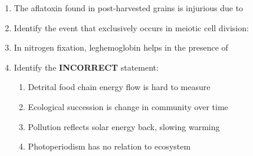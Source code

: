 \documentclass[journal]{IEEEtran}
\begin{document}
\begin{enumerate}
\item The aflatoxin found in post-harvested grains is injurious due to\hfill  \textit{}
\begin{enumerate}
\end{enumerate}

\item Identify the event that exclusively occurs in meiotic cell division:\hfill  \textit{}
\begin{enumerate}
\end{enumerate}

\item In nitrogen fixation, leghemoglobin helps in the presence of\hfill  \textit{}
\begin{enumerate}
\end{enumerate}

\item Identify the \textbf{INCORRECT} statement:\hfill  \textit{}
\begin{enumerate}
    \item Detrital food chain energy flow is hard to measure
    \item Ecological succession is change in community over time
    \item Pollution reflects solar energy back, slowing warming
    \item Photoperiodism has no relation to ecosystem
\end{enumerate}


\end{enumerate}
\end{document}
